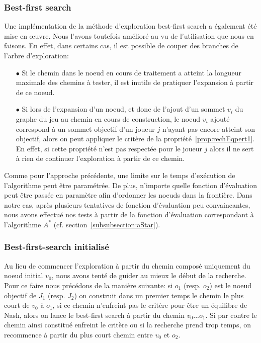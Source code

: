 \subsubsection*{Best-first search}

Une implémentation de la méthode d'exploration best-first search a également été mise en \oe uvre. Nous l'avons toutefois amélioré au vu de l'utilisation que nous en faisons. En effet, dans certains cas, il est possible de couper des branches de l'arbre d'exploration:

\begin{itemize}
	\item[$\bullet$] Si le chemin dans le noeud en cours de traitement a atteint la longueur maximale des chemins à tester, il est inutile de pratiquer l'expansion à partir de ce noeud.
	\item[$\bullet$]Si lors de l'expansion d'un noeud, et donc de l'ajout d'un sommet $v_i$ du graphe du jeu au chemin en cours de construction, le noeud  $v_i$ ajouté correspond à un sommet objectif d'un joueur $j$ n'ayant pas encore atteint son objectif, alors on peut appliquer le critère de la propriété~\ref{prop:rechEqpert1}. En effet, si cette propriété n'est pas respectée pour le joueur $j$ alors il ne sert à rien de continuer l'exploration à partir de ce chemin.
\end{itemize}

Comme pour l'approche précédente, une limite sur le temps d'exécution de l'algorithme peut être paramétrée. De plus, n'importe quelle fonction d'évaluation peut être passée en paramètre afin d'ordonner les noeuds dans la frontière. Dans notre cas, après plusieurs tentatives de fonction d'évaluation peu convaincantes, nous avons effectué nos tests à partir de la fonction d'évaluation correspondant à l'algorithme $A^*$ (cf. section~\ref{subsubsection:aStar}).

\subsubsection*{Best-first-search initialisé}

Au lieu de commencer l'exploration à partir du chemin composé uniquement du noeud initial $v_0$, nous avons tenté de guider au mieux le début de la recherche. Pour ce faire nous précédons de la manière suivante: si $o_1$ (resp. $o_2$) est le noeud objectif de $J_1$ (resp. $J_2$) on construit dans un premier temps le chemin le plus court de $v_0$ à $o_1$, si ce chemin n'enfreint pas le critère pour être un équilibre de Nash, alors on lance le best-first search à partir du chemin $v_0 ... o_1$. Si par contre le chemin ainsi constitué enfreint le critère ou si la recherche prend trop temps, on recommence à partir du plus court chemin entre $v_0$ et $o_2$.




	